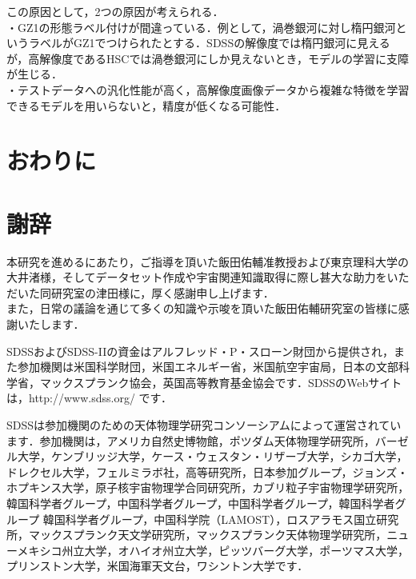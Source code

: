 \documentclass[a4j, 11pt]{jreport}
\begin{document}
この原因として，2つの原因が考えられる．\\
・GZ1の形態ラベル付けが間違っている．例として，渦巻銀河に対し楕円銀河というラベルがGZ1でつけられたとする．SDSSの解像度では楕円銀河に見えるが，高解像度であるHSCでは渦巻銀河にしか見えないとき，モデルの学習に支障が生じる．\\
・テストデータへの汎化性能が高く，高解像度画像データから複雑な特徴を学習できるモデルを用いらないと，精度が低くなる可能性．




\newpage
\chapter{おわりに}





\newpage
\nocite{*}                 %


\newpage
\chapter*{謝辞}
本研究を進めるにあたり，ご指導を頂いた飯田佑輔准教授および東京理科大学の大井渚様，そしてデータセット作成や宇宙関連知識取得に際し甚大な助力をいただいた同研究室の津田様に，厚く感謝申し上げます．\\
また，日常の議論を通じて多くの知識や示唆を頂いた飯田佑輔研究室の皆様に感謝いたします．

SDSSおよびSDSS-IIの資金はアルフレッド・P・スローン財団から提供され，また参加機関は米国科学財団，米国エネルギー省，米国航空宇宙局，日本の文部科学省，マックスプランク協会，英国高等教育基金協会です．SDSSのWebサイトは，http://www.sdss.org/ です． 

SDSSは参加機関のための天体物理学研究コンソーシアムによって運営されています．参加機関は，アメリカ自然史博物館，ポツダム天体物理学研究所，バーゼル大学，ケンブリッジ大学，ケース・ウェスタン・リザーブ大学，シカゴ大学，ドレクセル大学，フェルミラボ社，高等研究所，日本参加グループ，ジョンズ・ホプキンス大学，原子核宇宙物理学合同研究所，カブリ粒子宇宙物理学研究所，韓国科学者グループ，中国科学者グループ，中国科学者グループ，韓国科学者グループ 韓国科学者グループ，中国科学院（LAMOST），ロスアラモス国立研究所，マックスプランク天文学研究所，マックスプランク天体物理学研究所，ニューメキシコ州立大学，オハイオ州立大学，ピッツバーグ大学，ポーツマス大学，プリンストン大学，米国海軍天文台，ワシントン大学です．
\end{document}
